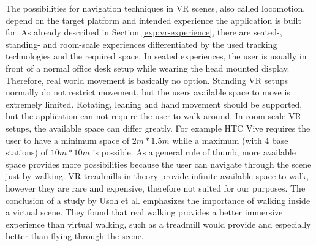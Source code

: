 The possibilities for navigation techniques in VR scenes, also called locomotion, depend on the target platform and intended experience the application is built for. As already described in Section \ref{exp:vr-experience}, there are seated-, standing- and room-scale experiences differentiated by the used tracking technologies and the required space.
In seated experiences, the user is usually in front of a normal office desk setup while wearing the head mounted display. Therefore, real world movement is basically no option. 
Standing VR setups normally do not restrict movement, but the users available space to move is extremely limited. Rotating, leaning and hand movement should be supported, but the application can not require the user to walk around.
In room-scale VR setups, the available space can differ greatly. For example HTC Vive requires the user to have a minimum space of $2m * 1.5m$ while a maximum (with 4 base stations) of $10m * 10m$ is possible. As a general rule of thumb, more available space provides more possibilities because the user can navigate through the scene just by walking. 
VR treadmills in theory provide infinite available space to walk, however they are rare and expensive, therefore not suited for our purposes. The conclusion of a study by Usoh et al. \cite{usoh_walking_1999} emphasizes the importance of walking inside a virtual scene. They found that real walking provides a better immersive experience than virtual walking, such as a treadmill would provide and especially better than flying through the scene. 

